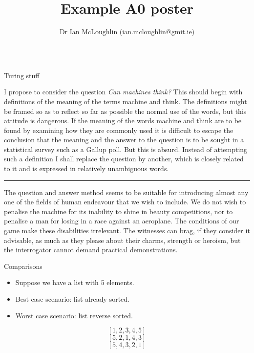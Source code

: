 \documentclass[dvipsnames, final]{beamer}
\title{Example A0 poster}
\subtitle{}
\author{Dr Ian McLoughlin (ian.mcloughlin@gmit.ie)}
\institute{Department and University Name}
\date{}
\newcommand{\hr}{\rule{\textwidth}{0.5pt}\newline}
\newlength{\colwidth}
\begin{document}

\setlength{\belowcaptionskip}{2ex} %
\setlength\belowdisplayshortskip{2ex} %

\begin{frame}[t,fragile]

\begin{columns}[t]

\begin{column}{\colwidth}


\begin{block}{Turing stuff}
  
  \justifying
  I propose to consider the question \emph{Can machines think?}
  This should begin with definitions of the meaning of the terms machine and think.
  The definitions might be framed so as to reflect so far as possible the normal use of the words, but this attitude is dangerous.
  If the meaning of the words machine and think are to be found by examining how they are commonly used it is difficult to escape the conclusion that the meaning and the answer to the question is to be sought in a statistical survey such as a Gallup poll.
  But this is absurd.
  Instead of attempting such a definition I shall replace the question by another, which is closely related to it and is expressed in relatively unambiguous words.
  \hr
  The question and answer method seems to be suitable for introducing almost any one of the fields of human endeavour that we wish to include.
  We do not wish to penalise the machine for its inability to shine in beauty competitions, nor to penalise a man for losing in a race against an aeroplane.
  The conditions of our game make these disabilities irrelevant.
  The witnesses can brag, if they consider it advisable, as much as they please about their charms, strength or heroism, but the interrogator cannot demand practical demonstrations.
\end{block}


\begin{block}{Comparisons}
  \begin{itemize}
    \item Suppose we have a list with 5 elements.
    \item Best case scenario: list already sorted.
    \item Worst case scenario: list reverse sorted.
  \end{itemize}
  \[ [1,2,3,4,5] \]
  \[ [5,2,1,4,3] \]
  \[ [5,4,3,2,1] \]
\end{block}



\end{column}
\end{columns}
\end{frame}
\end{document}
